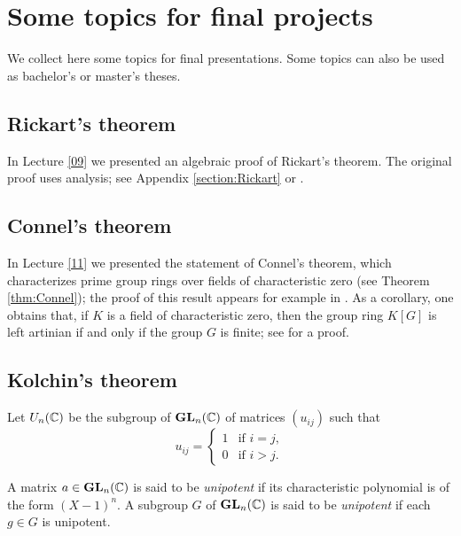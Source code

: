 \section*{Some topics for final projects}

\pagestyle{plain}
\fancyhf{}
\fancyfoot[CE,CO]{\leftmark}
\fancyfoot[LE,RO]{\thepage}


We collect here some topics for final presentations. Some topics
can also be used as bachelor's or master's theses. 

\subsection*{Rickart's theorem}

In Lecture \ref{09} we presented an algebraic proof of Rickart's theorem. 
The original proof uses analysis; see Appendix \ref{section:Rickart} or \cite[(6.4) of Chapter II]{MR1838439}. 

\subsection*{Connel's theorem}

In Lecture \ref{11} we presented the statement of Connel's theorem, which
characterizes prime group rings over fields of characteristic zero 
(see Theorem \ref{thm:Connel}); the proof of this  
result appears for example in \cite[Theorem 2.10 of Chapter 4]{MR798076}. 
As a corollary, one obtains 
that, if $K$ is a field of characteristic zero,
then the group ring $K[G]$ is left artinian if and only if the group
$G$ is finite; see 
\cite[Theorem 1.1 of Chapter 10]{MR798076} for a proof. 

\subsection*{Kolchin's theorem}

Let $U_n(\mathbb{C})$ be the subgroup of $\mathbf{GL}_n(\mathbb{C})$ 
of matrices $(u_{ij})$ such that 
\[
u_{ij}=\begin{cases}
1&\text{if $i=j$},\\
0&\text{if $i>j$}.\end{cases}
\]

A matrix $a\in\mathbf{GL}_n(\mathbb{C})$ is said to be \emph{unipotent} 
if its characteristic polynomial is of the form $(X-1)^n$. 
A subgroup $G$ of $\mathbf{GL}_n(\mathbb{C})$ is said to be \emph{unipotent} if
each $g\in G$ is unipotent. 

